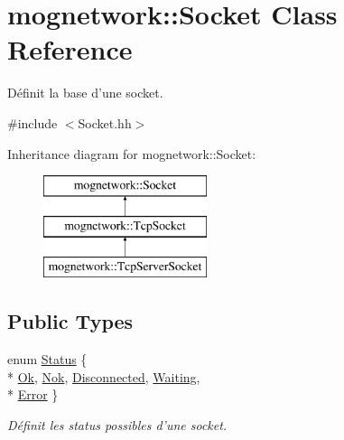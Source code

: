 \hypertarget{classmognetwork_1_1_socket}{\section{mognetwork\-:\-:Socket Class Reference}
\label{classmognetwork_1_1_socket}
}


Définit la base d'une socket.  




{\ttfamily \#include $<$Socket.\-hh$>$}

Inheritance diagram for mognetwork\-:\-:Socket\-:\begin{figure}[H]
\begin{center}
\leavevmode
\includegraphics[height=3.000000cm]{classmognetwork_1_1_socket}
\end{center}
\end{figure}
\subsection*{Public Types}
\begin{DoxyCompactItemize}
\item 
enum \hyperlink{classmognetwork_1_1_socket_aa187a8394ac0d6203af0ec7f021ca15f}{Status} \{ \\*
\hyperlink{classmognetwork_1_1_socket_aa187a8394ac0d6203af0ec7f021ca15fa1a76bb652d4c1fdb64829e97b7062a7b}{Ok}, 
\hyperlink{classmognetwork_1_1_socket_aa187a8394ac0d6203af0ec7f021ca15fa088ded708dfc87053ea73283b18929b5}{Nok}, 
\hyperlink{classmognetwork_1_1_socket_aa187a8394ac0d6203af0ec7f021ca15fa76cee46670ca9c26209aaf48ba12a6ea}{Disconnected}, 
\hyperlink{classmognetwork_1_1_socket_aa187a8394ac0d6203af0ec7f021ca15fa73f0c13cec39a68a4896b33c916d551c}{Waiting}, 
\\*
\hyperlink{classmognetwork_1_1_socket_aa187a8394ac0d6203af0ec7f021ca15fae82858abe36f6f41dde52bea32212238}{Error}
 \}
\begin{DoxyCompactList}\small\item\em Définit les status possibles d'une socket. \end{DoxyCompactList}\end{DoxyCompactItemize}
